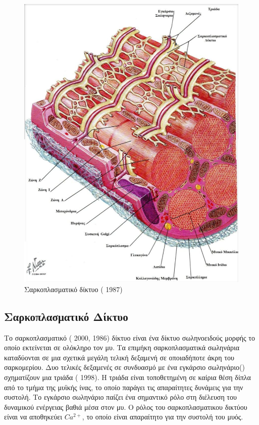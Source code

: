 \begin{figure}[H]
    \centering
    \includegraphics[width=.7\textwidth, height=0.6\textheight]{neuromusculoskeletal/fig/muscle-fysiology3.png}
    \caption{Σαρκοπλασματικό δίκτυο ( 1987)}
    \label{fig:muscle-fysiology3}
\end{figure}

\subsection{Σαρκοπλασματικό Δίκτυο}

Το σαρκοπλασματικό ( 2000,  1986) δίκτυο είναι ένα δίκτυο σωληνοειδούς μορφής το οποίο εκτείνεται σε ολόκληρο τον μυ. Τα επιμήκη σαρκοπλασματικά σωληνάρια καταδύονται σε μια σχετικά μεγάλη τελική δεξαμενή σε οποιαδήποτε άκρη του σαρκομερίου. Δυο τελικές δεξαμενές σε συνδυασμό με ένα εγκάρσιο σωληνάριο() σχηματίζουν μια τριάδα ( 1998). Η τριάδα είναι τοποθετημένη σε καίρια θέση δίπλα από το τμήμα της μυϊκής ίνας, το οποίο παράγει τις απαραίτητες δυνάμεις για την συστολή. Το εγκάρσιο σωληνάριο παίζει ένα σημαντικό ρόλο στη διέλευση του δυναμικού ενέργειας βαθιά μέσα στον μυ. Ο ρόλος του σαρκοπλασματικου δικτύου είναι να αποθηκεύει $Ca^{2+}$, το οποίο είναι απαραίτητο για την συστολή του μυός.

